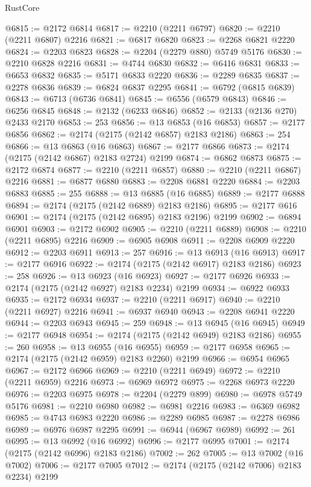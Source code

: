 \begin{lexlean}{RustCore}
\begin{coremodule}
@6815 := @2172 @6814
@6817 := @2210 (@2211 @6797)
@6820 := @2210 (@2211 @6807) @2216
@6821 := @6817 @6820
@6823 := @2268 @6821 @2220
@6824 := @2203 @6823
@6828 := @2204 (@2279 @880) @5749 @5176
@6830 := @2210 @6828 @2216
@6831 := @4744 @6830
@6832 := @6416 @6831
@6833 := @6653 @6832
@6835 := @5171 @6833 @2220
@6836 := @2289 @6835
@6837 := @2278 @6836
@6839 := @6824 @6837 @2295
@6841 := @6792 (@6815 @6839)
@6843 := @6713 (@6736 @6841)
@6845 := @6556 (@6579 @6843)
@6846 := @6256 @6845
@6848 := @2132 (@6233 @6846)
@6852 := @2133 (@2136 @270) @2433 @2170
@6853 := 253
@6856 := @13 @6853 (@16 @6853)
@6857 := @2177 @6856
@6862 := @2174 (@2175 (@2142 @6857) @2183 @2186)
@6863 := 254
@6866 := @13 @6863 (@16 @6863)
@6867 := @2177 @6866
@6873 := @2174 (@2175 (@2142 @6867) @2183 @2724) @2199
@6874 := @6862 @6873
@6875 := @2172 @6874
@6877 := @2210 (@2211 @6857)
@6880 := @2210 (@2211 @6867) @2216
@6881 := @6877 @6880
@6883 := @2208 @6881 @2220
@6884 := @2203 @6883
@6885 := 255
@6888 := @13 @6885 (@16 @6885)
@6889 := @2177 @6888
@6894 := @2174 (@2175 (@2142 @6889) @2183 @2186)
@6895 := @2177 @616
@6901 := @2174 (@2175 (@2142 @6895) @2183 @2196) @2199
@6902 := @6894 @6901
@6903 := @2172 @6902
@6905 := @2210 (@2211 @6889)
@6908 := @2210 (@2211 @6895) @2216
@6909 := @6905 @6908
@6911 := @2208 @6909 @2220
@6912 := @2203 @6911
@6913 := 257
@6916 := @13 @6913 (@16 @6913)
@6917 := @2177 @6916
@6922 := @2174 (@2175 (@2142 @6917) @2183 @2186)
@6923 := 258
@6926 := @13 @6923 (@16 @6923)
@6927 := @2177 @6926
@6933 := @2174 (@2175 (@2142 @6927) @2183 @2234) @2199
@6934 := @6922 @6933
@6935 := @2172 @6934
@6937 := @2210 (@2211 @6917)
@6940 := @2210 (@2211 @6927) @2216
@6941 := @6937 @6940
@6943 := @2208 @6941 @2220
@6944 := @2203 @6943
@6945 := 259
@6948 := @13 @6945 (@16 @6945)
@6949 := @2177 @6948
@6954 := @2174 (@2175 (@2142 @6949) @2183 @2186)
@6955 := 260
@6958 := @13 @6955 (@16 @6955)
@6959 := @2177 @6958
@6965 := @2174 (@2175 (@2142 @6959) @2183 @2260) @2199
@6966 := @6954 @6965
@6967 := @2172 @6966
@6969 := @2210 (@2211 @6949)
@6972 := @2210 (@2211 @6959) @2216
@6973 := @6969 @6972
@6975 := @2268 @6973 @2220
@6976 := @2203 @6975
@6978 := @2204 (@2279 @899)
@6980 := @6978 @5749 @5176
@6981 := @2210 @6980
@6982 := @6981 @2216
@6983 := @6369 @6982
@6985 := @4743 @6983 @2220
@6986 := @2289 @6985
@6987 := @2278 @6986
@6989 := @6976 @6987 @2295
@6991 := @6944 (@6967 @6989)
@6992 := 261
@6995 := @13 @6992 (@16 @6992)
@6996 := @2177 @6995
@7001 := @2174 (@2175 (@2142 @6996) @2183 @2186)
@7002 := 262
@7005 := @13 @7002 (@16 @7002)
@7006 := @2177 @7005
@7012 := @2174 (@2175 (@2142 @7006) @2183 @2234) @2199

\end{coremodule}
\end{lexlean}
